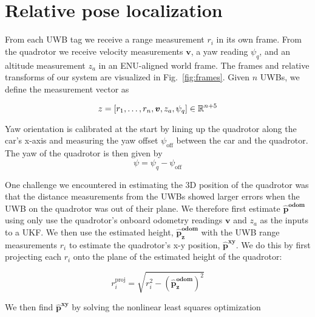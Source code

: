 
\section{Relative pose localization}

From each UWB tag we receive a range measurement $r_i$ in its own frame. 
From the quadrotor we receive velocity measurements $\bm{v}$, a yaw reading $\psi_q$,
and an altitude measurement $z_a$ in an ENU-aligned world frame. The frames and relative
transforms of our system are visualized in Fig.~\ref{fig:frames}.
Given $n$ UWBs, we define the measurement vector as

$$
   z = [r_1, \dots, r_n, \bm{v}, z_a, \psi_q] \in \mathbb{R}^{n+5}
$$



Yaw orientation is calibrated at the start by lining up the quadrotor along the car's x-axis
and measuring the yaw offset $\psi_{\text{off}}$ between the car and the quadrotor.
The yaw of the quadrotor is then given by
$$
   \psi = \psi_q - \psi_{\text{off}}
$$

One challenge we encountered in estimating the 3D position of the quadrotor was that
the distance measurements from the UWBs showed larger errors when the UWB on the quadrotor was out of their plane.
We therefore first estimate $\bm{\hat{p}^{\text{odom}}}$ using only use the quadrotor's onboard 
odometry readings $\bm{v}$ and $z_a$ as the inputs to a UKF. We then use the estimated
height, $\bm{\hat{p}_z^{\text{odom}}}$ with the UWB range
measurements $r_i$ to estimate the quadrotor's x-y position, $\bm{\hat{p}^{xy}}$.
We do this by first projecting each $r_i$ onto the plane of the estimated height of the quadrotor:

$$
   r_i^{\text{proj}} = \sqrt{r_i^2 - (\bm{\hat{p}_z^{\text{odom}}})^2}
$$

We then find $\bm{\hat{p}^{xy}}$ by solving the nonlinear least squares optimization

